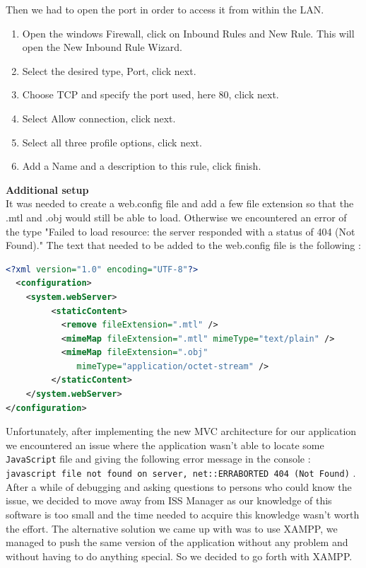 \documentclass{scrbook}
\begin{document}
Then we had to open the port in order to access it from within the LAN.
\begin{enumerate}
  \item Open the windows Firewall, click on Inbound Rules and New Rule. This will open the New Inbound Rule Wizard.
  \item Select the desired type, Port, click next.
  \item Choose TCP and specify the port used, here 80, click next.
  \item Select Allow connection, click next.
  \item Select all three profile options, click next.
  \item Add a Name and a description to this rule, click finish.
\end{enumerate}

\textbf{Additional setup}\\

It was needed to create a web.config file and add a few file extension so that the .mtl and .obj would still be able to load. 
Otherwise we encountered an error of the type "Failed to load resource: the server responded with a status of 404 (Not Found)." 
The text that needed to be added to the web.config file is the following : \\
\begin{lstlisting}[language=XML, basicstyle=\ttfamily\small]
<?xml version="1.0" encoding="UTF-8"?>
  <configuration>
    <system.webServer>
         <staticContent>
           <remove fileExtension=".mtl" />
           <mimeMap fileExtension=".mtl" mimeType="text/plain" />
           <mimeMap fileExtension=".obj" 
              mimeType="application/octet-stream" />
         </staticContent>
    </system.webServer>
</configuration>
\end{lstlisting}

Unfortunately, after implementing the new MVC architecture for our application we encountered an issue where the application wasn't able to locate some \texttt{JavaScript} file and giving the following error message in the console : 
\texttt{javascript file not found on server, net::ERR\textunderscore ABORTED 404 (Not Found)} .  After a while of debugging and asking questions to persons who could know the issue, 
we decided to move away from ISS Manager as our knowledge of this software is too small and the time needed to acquire this knowledge wasn't worth the effort. 
The alternative solution we came up with was to use XAMPP, we managed to push the same version of the application without any problem and without having to do anything special. So we decided to go forth with XAMPP.
\end{document}
